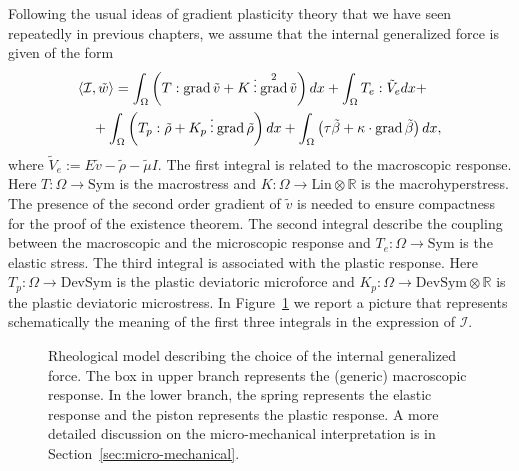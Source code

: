 \documentclass[a4paper,10pt,twoside]{amsbook}
\numberwithin{section}{chapter}
\numberwithin{equation}{chapter}
\theoremstyle{definition}
\DeclareMathOperator{\grad}{grad}
\DeclarePairedDelimiter{\dual}{\langle}{\rangle}
\newcommand{\threedots}{\mathbin{\vdots}}
\begin{document}
Following the usual ideas of gradient plasticity theory that we have seen repeatedly in previous chapters, we assume that the internal generalized force is given of the form
\begin{equation}
\label{eqn:internal-power}
\begin{multlined}
\dual{\mathcal{I},\tilde w}=\int_\Omega\left(T:\grad\tilde v+K\threedots\grad^2\tilde v\right)dx+\int_\Omega T_e:\tilde V_edx+\\
+\int_\Omega\left(T_p:\tilde\rho+K_p\threedots\grad\tilde\rho\right)dx+\int_\Omega\left(\tau\tilde\beta+\kappa\cdot\grad\tilde\beta\right)dx,
\end{multlined}
\end{equation}
where $\tilde V_e:=E\tilde v-\tilde\rho-\tilde\mu I$. The first integral is related to the macroscopic response. Here $T\colon\Omega\to\text{Sym}$ is the macrostress and $K\colon\Omega\to\text{Lin}\otimes\mathbb{R}$ is the macrohyperstress. The presence of the second order gradient of $\tilde v$ is needed to ensure compactness for the proof of the existence theorem. The second integral describe the coupling between the macroscopic and the microscopic response and $T_e\colon\Omega\to\text{Sym}$ is the elastic stress. The third integral is associated with the plastic response. Here $T_p\colon\Omega\to\text{DevSym}$ is the plastic deviatoric microforce and $K_p\colon\Omega\to\text{DevSym}\otimes\mathbb{R}$ is the plastic deviatoric microstress. In Figure~\ref{fig:rheological-new} we
report a picture that represents schematically the meaning of the first three integrals in the expression of $\mathcal{I}$.
\begin{figure}
\centering
{}
\caption{Rheological model describing the choice of the internal generalized force. The
box in upper branch represents the (generic) macroscopic response. In the lower branch,
the spring represents the elastic response and the piston represents the plastic response. A more detailed discussion on the micro-mechanical interpretation is in Section~\ref{sec:micro-mechanical}.}
\label{fig:rheological-new}
\end{figure}
\end{document}
